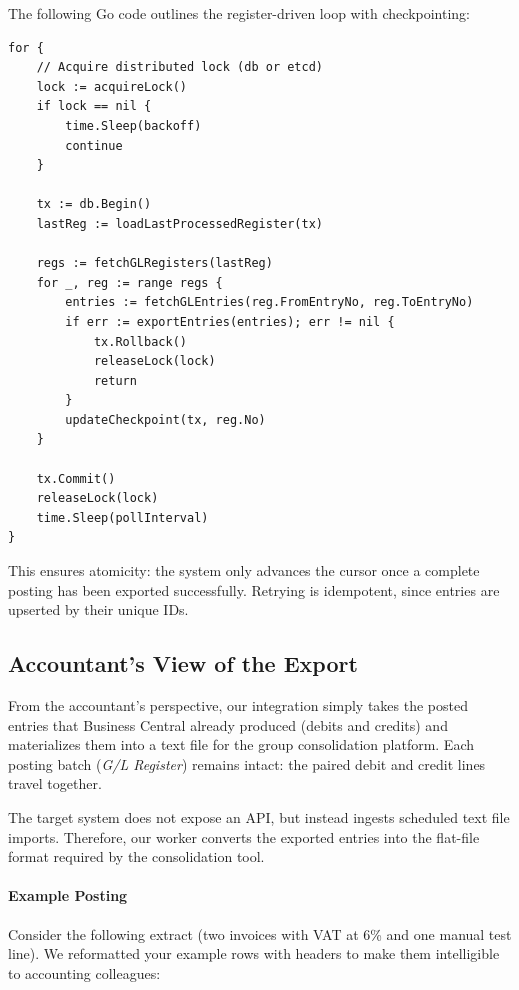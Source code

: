 \documentclass[a4paper,10pt]{article}
\begin{document}
The following Go code outlines the register-driven loop with checkpointing:

\begin{verbatim}
for {
    // Acquire distributed lock (db or etcd)
    lock := acquireLock()
    if lock == nil {
        time.Sleep(backoff)
        continue
    }

    tx := db.Begin()
    lastReg := loadLastProcessedRegister(tx)

    regs := fetchGLRegisters(lastReg)
    for _, reg := range regs {
        entries := fetchGLEntries(reg.FromEntryNo, reg.ToEntryNo)
        if err := exportEntries(entries); err != nil {
            tx.Rollback()
            releaseLock(lock)
            return
        }
        updateCheckpoint(tx, reg.No)
    }

    tx.Commit()
    releaseLock(lock)
    time.Sleep(pollInterval)
}
\end{verbatim}

This ensures atomicity: the system only advances the cursor once a complete posting has been exported successfully. Retrying is idempotent, since entries are upserted by their unique IDs.

\subsection{Accountant’s View of the Export}

From the accountant’s perspective, our integration simply takes the posted entries that Business Central already produced (debits and credits) and materializes them into a text file for the group consolidation platform. Each posting batch (\emph{G/L Register}) remains intact: the paired debit and credit lines travel together. 

The target system does not expose an API, but instead ingests scheduled text file imports. Therefore, our worker converts the exported entries into the flat-file format required by the consolidation tool.

\paragraph{Example Posting}

Consider the following extract (two invoices with VAT at 6\% and one manual test line). We reformatted your example rows with headers to make them intelligible to accounting colleagues:
\end{document}
